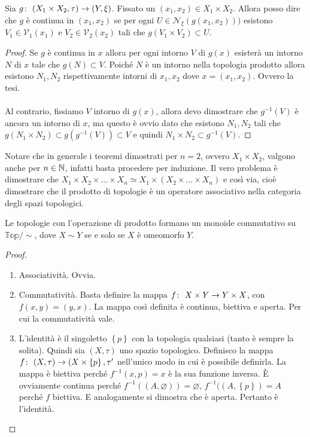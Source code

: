 \begin{theorem}
	Sia $g \colon\ (X_1 \times X_2, \tau) \rightarrow (Y, \xi)$. Fissato un $(x_1, x_2) \in X_1 \times X_2$. Allora posso dire che $g$ è continua in $(x_1, x_2)$ se per ogni $U \in \mathcal{N}_\xi(g(x_1,x_2)))$ esistono $V_1 \in \mathcal{V}_1(x_1)$ e $V_2 \in \mathcal{V}_2(x_2)$ tali che $g(V_1 \times V_2) \subset U$.
\end{theorem}
\begin{proof}
	Se $g$ è continua in $x$ allora per ogni intorno $V$ di $g(x)$ esisterà un intorno $N$ di $x$ tale che $g(N) \subset V$. Poiché $N$ è un intorno nella topologia prodotto allora esistono $N_1, N_2$ rispettivamente intorni di $x_1, x_2$ dove $x = (x_1, x_2)$. Ovvero la tesi.\\ \\
	Al contrario, fissiamo $V$ intorno di $g(x)$, allora devo dimostrare che $g^{-1}(V)$ è ancora un intorno di $x$, ma questo è ovvio dato che esistono $N_1, N_2$ tali che $g(N_1 \times N_2) \subset g(g^{-1}(V)) \subset V$ e quindi $N_1 \times N_2 \subset g^{-1}(V)$. 
\end{proof}

Notare che in generale i teoremi dimostrati per $n=2$, ovvero $X_1 \times X_2$, valgono anche per $n \in \mathbb{N}$, infatti basta procedere per induzione. Il vero problema è dimostrare che $X_1 \times X_2 \times \dots \times X_n \simeq X_1 \times (X_2 \times \dots \times X_n)$ e così via, cioè dimostrare che il prodotto di topologie è un operatore associativo nella categoria degli spazi topologici. 

\begin{theorem}
	Le topologie con l'operazione di prodotto formano un monoide commutativo su $\mathbb{Top}/\sim$, dove $X\sim Y$ se e solo se $X$ è omeomorfo $Y$.
\end{theorem}
\begin{proof} \
	\begin{enumerate}
		\item Associatività. Ovvia.
		\item Commutatività. Basta definire la mappa $f \colon\ X\times Y \rightarrow Y \times X$, con $f(x,y) = (y,x)$. La mappa così definita è continua, biettiva e aperta. Per cui la commutatività vale.
		\item L'identità è il singoletto $\left\{p\right\}$ con la topologia qualsiasi (tanto è sempre la solita). Quindi sia $(X, \tau)$ uno spazio topologico. Definisco la mappa $f \colon\ (X, \tau) \rightarrow (X\times \left\{p\right\}, \tau'$ nell'unico modo in cui è possibile definirla. La mappa è biettiva perché $f^{-1}(x, p) = x$ è la sua funzione inversa. È ovviamente continua perché $f^{-1}((A, \varnothing)) = \varnothing$, $f^{-1}((A, \left\{p\right\})= A$ perché $f$ biettiva. E analogamente si dimostra che è aperta. Pertanto è l'identità. 
	\end{enumerate}
\end{proof}




